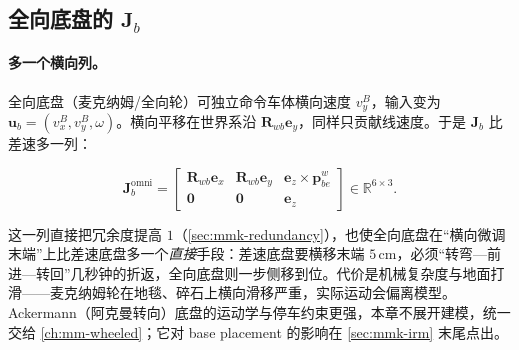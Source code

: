 \subsection{全向底盘的 \texorpdfstring{$\mathbf{J}_b$}{Jb}}
\label{sec:mmk-jac-omni}

\paragraph{多一个横向列。}
全向底盘（麦克纳姆/全向轮）可独立命令车体横向速度 $v_y^B$，输入变为 $\mathbf{u}_b=(v_x^B,v_y^B,\omega)$。横向平移在世界系沿 $\mathbf{R}_{wb}\mathbf{e}_y$，同样只贡献线速度。于是 $\mathbf{J}_b$ 比差速多一列：

\begin{proposition}\label{prop:mmk-Jb-omni}
\begin{equation}
  \mathbf{J}_b^{\text{omni}}=
  \begin{bmatrix}\mathbf{R}_{wb}\mathbf{e}_x & \mathbf{R}_{wb}\mathbf{e}_y & \mathbf{e}_z\times\mathbf{p}_{be}^w\\[2pt]
  \mathbf{0} & \mathbf{0} & \mathbf{e}_z\end{bmatrix}\in\mathbb{R}^{6\times3}.
  \label{eq:mmk-Jb-omni}
\end{equation}
\end{proposition}

\noindent 这一列直接把冗余度提高 $1$（\cref{sec:mmk-redundancy}），也使全向底盘在“横向微调末端”上比差速底盘多一个\emph{直接}手段：差速底盘要横移末端 $5\,$cm，必须“转弯—前进—转回”几秒钟的折返，全向底盘则一步侧移到位。代价是机械复杂度与地面打滑——麦克纳姆轮在地毯、碎石上横向滑移严重，实际运动会偏离模型。Ackermann（阿克曼转向）底盘的运动学与停车约束更强，本章不展开建模，统一交给 \cref{ch:mm-wheeled}；它对 base placement 的影响在 \cref{sec:mmk-irm} 末尾点出。

